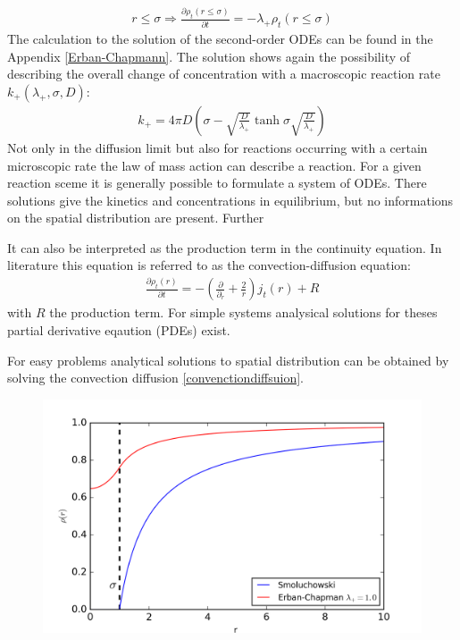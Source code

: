 \documentclass[
  a4paper,BCOR10mm,oneside,
  bibtotoc,idxtotoc,
  headsepline,footsepline,%
  fleqn,openbib
]{scrbook}
\begin{document}
\begin{align}
r\leq \sigma \Rightarrow \frac{\partial \rho_t(r \leq \sigma)}{\partial t}=-\lambda_{+} \rho_t (r \leq \sigma)
\end{align}
The calculation to the solution of the second-order ODEs can be found in the Appendix \cref{Erban-Chapmann}. The solution shows again the possibility of describing the overall change of concentration with a macroscopic reaction rate $k_{+}(\lambda_{+},\sigma,D)$:
\begin{align}
k_{+}=4\pi D \left( \sigma-\sqrt{\frac{D}{\lambda_{+}}} \tanh{\sigma \sqrt{\frac{D}{\lambda_{+}}}}\right)
\end{align}
Not only in the diffusion limit but also for reactions occurring with a certain microscopic rate the law of mass action can describe a reaction. For a given reaction sceme it is generally possible to formulate a system of ODEs. There solutions give the kinetics and concentrations in equilibrium, but no informations on the spatial distribution are present. Further  

It can also be interpreted as the production term in the continuity equation. In literature this equation is referred to as the convection-diffusion equation:
\begin{align}
 \frac{\partial \rho_t(r)}{\partial t}=-\left(\frac{\partial}{\partial_r}+\frac{2}{r} \right) j_t(r) + R \label{convenctiondiffsuion}
\end{align}
with $R$ the production term. For simple systems analysical solutions for theses partial derivative eqaution (PDEs) exist. 


For easy problems analytical solutions to spatial distribution can be obtained by solving the convection diffusion \cref{convenctiondiffsuion}. \newline
\begin{figure}[h!]
  \centering
  \includegraphics[width=\textwidth]{./data/smoluchowskierban.png}
  \captionsetup{width=\linewidth}
  \label{fig:diffusion_limit-Erban-Chapmann-figure}
\end{figure}
\end{document}
